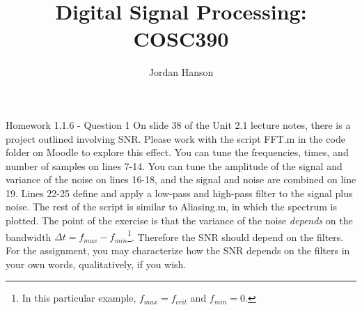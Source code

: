 \documentclass{beamer}
\title{Digital Signal Processing: COSC390}
\author{Jordan Hanson}
\institute{Whittier College Department of Physics and Astronomy}
\begin{document}
\maketitle

\begin{frame}{Homework 1.1.6 - Question 1}
\small
On slide 38 of the Unit 2.1 lecture notes, there is a project outlined involving SNR.  Please work with the script FFT.m in the code folder on Moodle to explore this effect.  You can tune the frequencies, times, and number of samples on lines 7-14.  You can tune the amplitude of the signal and variance of the noise on lines 16-18, and the signal and noise are combined on line 19.  Lines 22-25 define and apply a low-pass and high-pass filter to the signal plus noise.  The rest of the script is similar to Aliasing.m, in which the spectrum is plotted.  The point of the exercise is that the variance of the noise \textit{depends} on the bandwidth $\Delta t = f_{max}-f_{min}$\footnote{In this particular example, $f_{max} = f_{crit}$ and $f_{min} = 0$.}.  Therefore the SNR should depend on the filters.  For the assignment, you may characterize how the SNR depends on the filters in your own words, qualitatively, if you wish.
\end{frame}
\end{document}
